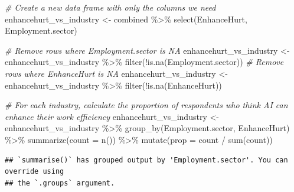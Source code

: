 \documentclass[
]{article}
\newenvironment{Shaded}{\begin{snugshade}}{\end{snugshade}}
\newcommand{\AttributeTok}[1]{\textcolor[rgb]{0.77,0.63,0.00}{#1}}
\newcommand{\CommentTok}[1]{\textcolor[rgb]{0.56,0.35,0.01}{\textit{#1}}}
\newcommand{\FunctionTok}[1]{\textcolor[rgb]{0.00,0.00,0.00}{#1}}
\newcommand{\NormalTok}[1]{#1}
\newcommand{\OtherTok}[1]{\textcolor[rgb]{0.56,0.35,0.01}{#1}}
\newcommand{\SpecialCharTok}[1]{\textcolor[rgb]{0.00,0.00,0.00}{#1}}
\begin{document}
\begin{Shaded}
\begin{Highlighting}[]
\CommentTok{\# Create a new data frame with only the columns we need}
\NormalTok{enhancehurt\_vs\_industry }\OtherTok{\textless{}{-}}\NormalTok{ combined }\SpecialCharTok{\%\textgreater{}\%} \FunctionTok{select}\NormalTok{(EnhanceHurt, Employment.sector)}

\CommentTok{\# Remove rows where Employment.sector is NA}
\NormalTok{enhancehurt\_vs\_industry }\OtherTok{\textless{}{-}}\NormalTok{ enhancehurt\_vs\_industry }\SpecialCharTok{\%\textgreater{}\%} \FunctionTok{filter}\NormalTok{(}\SpecialCharTok{!}\FunctionTok{is.na}\NormalTok{(Employment.sector))}
\CommentTok{\# Remove rows where EnhanceHurt is NA}
\NormalTok{enhancehurt\_vs\_industry }\OtherTok{\textless{}{-}}\NormalTok{ enhancehurt\_vs\_industry }\SpecialCharTok{\%\textgreater{}\%} \FunctionTok{filter}\NormalTok{(}\SpecialCharTok{!}\FunctionTok{is.na}\NormalTok{(EnhanceHurt))}

\CommentTok{\# For each industry, calculate the proportion of respondents who think AI can enhance their work efficiency}
\NormalTok{enhancehurt\_vs\_industry }\OtherTok{\textless{}{-}}\NormalTok{ enhancehurt\_vs\_industry }\SpecialCharTok{\%\textgreater{}\%}
  \FunctionTok{group\_by}\NormalTok{(Employment.sector, EnhanceHurt) }\SpecialCharTok{\%\textgreater{}\%}
  \FunctionTok{summarize}\NormalTok{(}\AttributeTok{count =} \FunctionTok{n}\NormalTok{()) }\SpecialCharTok{\%\textgreater{}\%}
  \FunctionTok{mutate}\NormalTok{(}\AttributeTok{prop =}\NormalTok{ count }\SpecialCharTok{/} \FunctionTok{sum}\NormalTok{(count))}
\end{Highlighting}
\end{Shaded}

\begin{verbatim}
## `summarise()` has grouped output by 'Employment.sector'. You can override using
## the `.groups` argument.
\end{verbatim}
\end{document}
